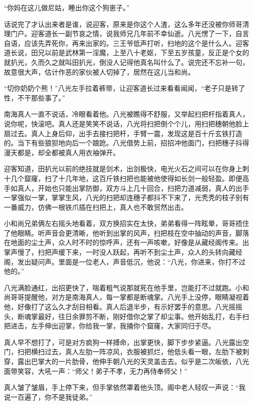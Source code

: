 “你妈在这儿做尼姑，睡出你这个狗崽子。”

话说完了才认出来者是谁，说迎客，原来是你这个人渣，这么多年还没被你师哥清理门户。迎客道长一副节哀之情，说我师兄几年前不幸仙逝。八光愣了一下，自言自语，应该先弄死你，再来出家的。三王爷低声打听，扫地的这个是什么人。迎客道长说，田兄以前是武林第一淫魔，上至八十老妪，下至五岁孩童，反正是个女的就扒光，久而久之就叫田扒光，倒没人记得他真名叫什么了。说完还不忘补一句，故意很大声，估计作恶的家伙被人切掉了，居然在这儿当和尚。

“切你奶奶个熊！”八光左手拉着裤带，让迎客道长过来看看闻闻，“老子只是转了性，不干那些事了。”

南海真人一直不说话，冷眼看着他。八光被瞧得不舒服，又举起扫把杆指着真人，说你呢，快滚吧。真人还是笑笑不说话，八光将扫把倒个个儿，用扫把穗朝他脸上扇过去。真人上身后仰，出手去接扫把杆，手臂一震，发现这是百十斤玄铁打造的。当下有些狼狈地向后一个踉跄。八光借势上前，招招冲他面门，扫把穗子抖得漫天都是，却全都被真人用衣袖弹开。

迎客知道，田扒光以前的绝技就是剑术，出剑极快，电光火石之间可以在你身上刺十几个窟窿，扫了十几年地，这百斤铁扫把也能被他使得如长剑一般轻盈。即便高手如真人，开始也只能出掌防御，双方斗上几十回合，扫把力道减弱，真人的出手一掌强似一掌，掌掌生风，八光的扫把却连穗子都抖不下来了，光秃秃的枝子别有一番威力，仿佛一根铁爪插在扫把上，真人也不敢贸然出击。

小和尚兄弟俩左右摇头地看着，双方换招实在太快，弟弟看得一阵眩晕，哥哥捂住了他眼睛。听声音会更清晰，他听到出掌的风声，扫把枝在空中抽动的声音，脚落在地面的尘土声，众人时不时的惊呼声，还有一声咳嗽，好像是从藏经阁传来。出掌声慢了，扫把声缓下来，一时没人跃起，再听不到尘土声，众人的头转向藏经阁，发出疑问声。里面是一位老人，声音低沉，他说：“八光，你进来，你打不过他的。”

八光满脸通红，出招更快了，喘着粗气说那就死在他手里，岂能打不过就跑。小和尚哥哥提醒他，对方是南海真人，每一掌都是断魂掌。八光手上没停，眼睛凝视着他，好像打了这么久才刮目相看。真人后退半步，有示好罢手的意思。八光摇摇头，断魂掌最好，往日余罪剪不断，刚好借你之掌了却尘事。他开始乱打，右手扫把进击，左手伸出迎掌，你给我一掌，我捅你个窟窿，大家同归于尽。

真人早不想打了，可是对方疯狗一样搏命，出掌更快，脚下步步紧逼。八光露出空门，扫把横扫过去，真人左肋一阵凉风，衣服被抓烂，他低头看一眼，左肋下被刺穿，露出巴掌大的一片肋骨，他伸手朝八光的天灵盖击去。似乎是二次皈依，八光面带笑容，大吼一声：“师父！弟子不孝，无力再侍奉师父！”

真人皱了皱眉，手上停下来，但手掌依然罩着他头顶。阁中老人轻叹一声说：“我说一百遍了，你不是我徒弟。”

